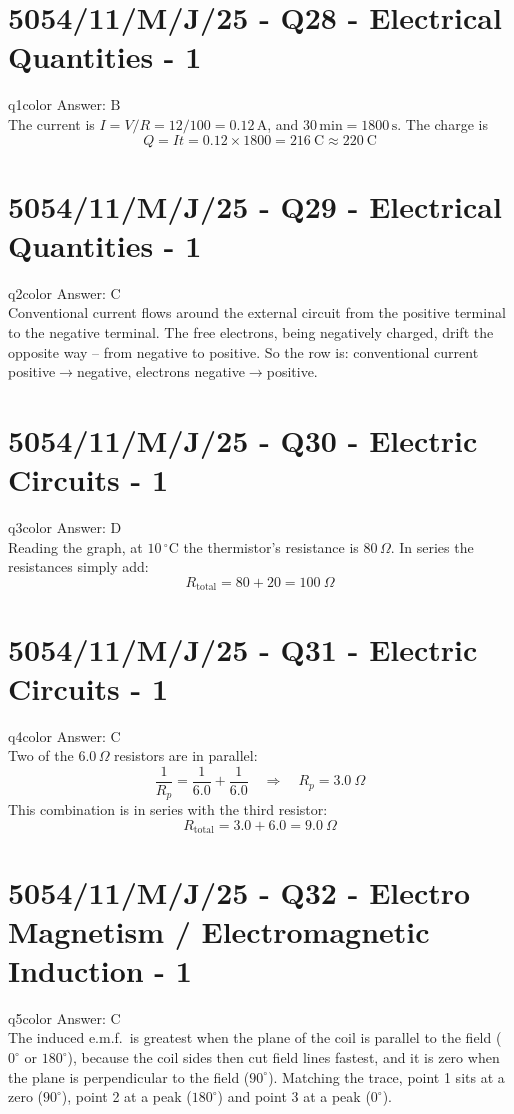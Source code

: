 \documentclass[11pt,a4paper]{article}
\newcommand{\examq}[4]{\section[#1 - Q#2]{#1 - Q#2 - #3 - #4}}
\begin{document}
\examq{5054/11/M/J/25}{28}{Electrical Quantities}{1}

\begin{ansbox}{q1color}
Answer: $\boxed{\text{B}}$\\[4pt]
The current is $I = V/R = 12/100 = 0.12\,\mathrm{A}$, and $30\,\text{min} = 1800\,\mathrm{s}$. The charge is
\[
Q = It = 0.12 \times 1800 = 216\ \mathrm{C} \approx \boxed{220\ \mathrm{C}}
\]
\end{ansbox}

\examq{5054/11/M/J/25}{29}{Electrical Quantities}{1}

\begin{ansbox}{q2color}
Answer: $\boxed{\text{C}}$\\[4pt]
Conventional current flows around the external circuit from the positive terminal to the negative terminal. The free electrons, being negatively charged, drift the opposite way -- from negative to positive. So the row is: conventional current positive$\rightarrow$negative, electrons negative$\rightarrow$positive.
\end{ansbox}

\examq{5054/11/M/J/25}{30}{Electric Circuits}{1}

\begin{ansbox}{q3color}
Answer: $\boxed{\text{D}}$\\[4pt]
Reading the graph, at $10\,^{\circ}$C the thermistor's resistance is $80\,\Omega$. In series the resistances simply add:
\[
R_\text{total} = 80 + 20 = \boxed{100\ \Omega}
\]
\end{ansbox}

\examq{5054/11/M/J/25}{31}{Electric Circuits}{1}

\begin{ansbox}{q4color}
Answer: $\boxed{\text{C}}$\\[4pt]
Two of the $6.0\,\Omega$ resistors are in parallel:
\[
\frac{1}{R_p} = \frac{1}{6.0} + \frac{1}{6.0} \quad\Rightarrow\quad R_p = 3.0\ \Omega
\]
This combination is in series with the third resistor:
\[
R_\text{total} = 3.0 + 6.0 = \boxed{9.0\ \Omega}
\]
\end{ansbox}

\examq{5054/11/M/J/25}{32}{Electro Magnetism / Electromagnetic Induction}{1}

\begin{ansbox}{q5color}
Answer: $\boxed{\text{C}}$\\[4pt]
The induced e.m.f.\ is greatest when the plane of the coil is parallel to the field ($0^{\circ}$ or $180^{\circ}$), because the coil sides then cut field lines fastest, and it is zero when the plane is perpendicular to the field ($90^{\circ}$). Matching the trace, point 1 sits at a zero ($90^{\circ}$), point 2 at a peak ($180^{\circ}$) and point 3 at a peak ($0^{\circ}$).
\end{ansbox}
\end{document}
